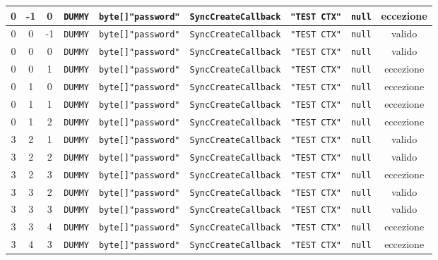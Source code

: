 \documentclass[10pt]{article}
\begin{document}
{\begin{table}[h]
{\begin{tabular}{|c|c|c|c|c|c|c|c|c|}
					0 & -1 & 0 & \texttt{DUMMY} & \texttt{byte[]{"password"}} & \texttt{SyncCreateCallback} & \texttt{"TEST CTX"} & \texttt{null} & eccezione \\
					\hline
					0 & 0 & -1 & \texttt{DUMMY} & \texttt{byte[]{"password"}} & \texttt{SyncCreateCallback} & \texttt{"TEST CTX"} & \texttt{null} & valido \\
					\hline
					0 & 0 & 0 & \texttt{DUMMY} & \texttt{byte[]{"password"}} & \texttt{SyncCreateCallback} & \texttt{"TEST CTX"} & \texttt{null} & valido \\
					\hline
					0 & 0 & 1 & \texttt{DUMMY} & \texttt{byte[]{"password"}} & \texttt{SyncCreateCallback} & \texttt{"TEST CTX"} & \texttt{null} & eccezione \\
					\hline
					0 & 1 & 0 & \texttt{DUMMY} & \texttt{byte[]{"password"}} & \texttt{SyncCreateCallback} & \texttt{"TEST CTX"} & \texttt{null} & eccezione \\
					\hline
					0 & 1 & 1 & \texttt{DUMMY} & \texttt{byte[]{"password"}} & \texttt{SyncCreateCallback} & \texttt{"TEST CTX"} & \texttt{null} & eccezione \\
					\hline
					0 & 1 & 2 & \texttt{DUMMY} & \texttt{byte[]{"password"}} & \texttt{SyncCreateCallback} & \texttt{"TEST CTX"} & \texttt{null} & eccezione \\
					\hline
					3 & 2 & 1 & \texttt{DUMMY} & \texttt{byte[]{"password"}} & \texttt{SyncCreateCallback} & \texttt{"TEST CTX"} & \texttt{null} & valido \\
					\hline
					3 & 2 & 2 & \texttt{DUMMY} & \texttt{byte[]{"password"}} & \texttt{SyncCreateCallback} & \texttt{"TEST CTX"} & \texttt{null} & valido \\
					\hline
					3 & 2 & 3 & \texttt{DUMMY} & \texttt{byte[]{"password"}} & \texttt{SyncCreateCallback} & \texttt{"TEST CTX"} & \texttt{null} & eccezione \\
					\hline
					3 & 3 & 2 & \texttt{DUMMY} & \texttt{byte[]{"password"}} & \texttt{SyncCreateCallback} & \texttt{"TEST CTX"} & \texttt{null} & valido \\
					\hline
					3 & 3 & 3 & \texttt{DUMMY} & \texttt{byte[]{"password"}} & \texttt{SyncCreateCallback} & \texttt{"TEST CTX"} & \texttt{null} & valido \\
					\hline
					3 & 3 & 4 & \texttt{DUMMY} & \texttt{byte[]{"password"}} & \texttt{SyncCreateCallback} & \texttt{"TEST CTX"} & \texttt{null} & eccezione \\
					\hline
					3 & 4 & 3 & \texttt{DUMMY} & \texttt{byte[]{"password"}} & \texttt{SyncCreateCallback} & \texttt{"TEST CTX"} & \texttt{null} & eccezione \\

\end{tabular}}
\end{table}}
\end{document}
